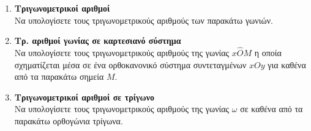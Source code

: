 \documentclass[twoside,nofonts,internet,twocolumn]{askhseis}
\newcommand{\tikzitem}{\leavevmode\vadjust{\vspace{-\baselineskip}}\newline}
\begin{document}
\begin{enumerate}
\begin{multicols}{4}
\begin{rlist}[leftmargin=4mm]
\end{rlist}
\end{multicols}
\item \textbf{Τριγωνομετρικοί αριθμοί}\\
Να υπολογίσετε τους τριγωνομετρικούς αριθμούς των παρακάτω γωνιών.
\begin{multicols}{3}
\begin{rlist}
\item $ 390\degree $
\item $ 450\degree $
\item $ 780\degree $
\item $ 1260\degree $
\item $ 1125\degree $
\item $ 1845\degree $
\end{rlist}
\end{multicols}
\item \textbf{Τρ. αριθμοί γωνίας σε καρτεσιανό σύστημα}\\
Να υπολογίσετε τους τριγωνομετρικούς αριθμούς της γωνίας $ x\hat{O}M $ η οποία σχηματίζεται μέσα σε ένα ορθοκανονικό σύστημα συντεταγμένων $ xOy $ για καθένα από τα παρακάτω σημεία $ M $.
\begin{multicols}{3}
\end{multicols}
\item \textbf{Τριγωνομετρικοί αριθμοί σε τρίγωνο}\\
Να υπολογίσετε τους τριγωνομετρικούς αριθμούς της γωνίας $ \omega $ σε καθένα από τα παρακάτω ορθογώνια τρίγωνα.
\begin{multicols}{2}
\end{multicols}
\end{enumerate}
\end{document}
